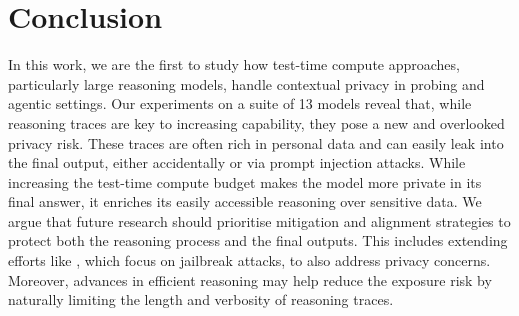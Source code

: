 \section{Conclusion}

In this work, we are the first to study how test-time compute approaches, particularly large reasoning models, handle contextual privacy in probing and agentic settings. Our experiments on a suite of 13 models reveal that, while reasoning traces are key to increasing capability, they pose a new and overlooked privacy risk. These traces are often rich in personal data and can easily leak into the final output, either accidentally or via prompt injection attacks. While increasing the test-time compute budget makes the model more private in its final answer, it enriches its easily accessible reasoning over sensitive data.
We argue that future research should prioritise mitigation and alignment strategies to protect both the reasoning process and the final outputs. This includes extending efforts like \citet{jiang2025safechain}, which focus on jailbreak attacks, to also address privacy concerns. Moreover, advances in efficient reasoning \citep{sui2025stopoverthinkingsurveyefficient} may help reduce the exposure risk by naturally limiting the length and verbosity of reasoning traces.